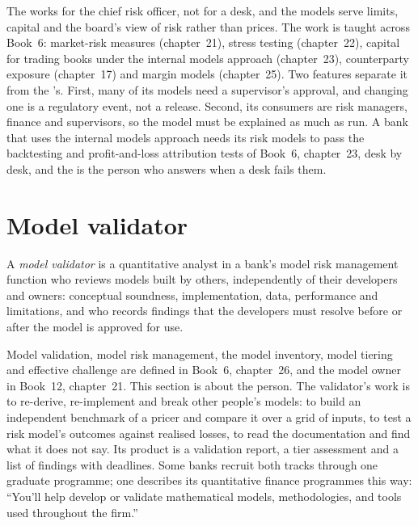 The  works for the chief risk officer, not for a desk, and the models serve limits, capital and the board's
view of risk rather than prices. The work is taught across Book~6: market-risk measures (chapter~21), stress testing
(chapter~22), capital for trading books under the internal models approach (chapter~23), counterparty exposure
(chapter~17) and margin models (chapter~25). Two features separate it from the 's. First, many of its
models need a supervisor's approval, and changing one is a regulatory event, not a release. Second, its consumers are
risk managers, finance and supervisors, so the model must be explained as much as run. A bank that uses the internal
models approach needs its risk models to pass the backtesting and profit-and-loss attribution tests of Book~6,
chapter~23, desk by desk, and the  is the person who answers when a desk fails them.

\section{Model validator}

\begin{definition}\label{def:in:bank-quant:validator}
A \emph{model validator} is a quantitative analyst in a bank's model risk management function who
reviews models built by others, independently of their developers and owners: conceptual soundness, implementation,
data, performance and limitations, and who records findings that the developers must resolve before or after the model is
approved for use.
\end{definition}

Model validation, model risk management, the model inventory, model tiering and effective challenge are defined in
Book~6, chapter~26, and the model owner in Book~12, chapter~21. This section is about the person. The validator's work is
to re-derive, re-implement and break other people's models: to build an independent benchmark of a pricer and compare it
over a grid of inputs, to test a risk model's outcomes against realised losses, to read the documentation and find what
it does not say. Its product is a validation report, a tier assessment and a list of findings with deadlines. Some banks
recruit both tracks through one graduate programme; one describes its quantitative finance programmes this way: ``You'll
help develop or validate mathematical models, methodologies, and tools used throughout the firm.''

